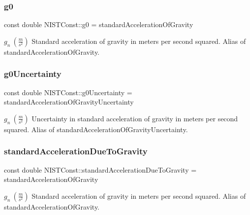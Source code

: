 \subsubsection{\texorpdfstring{g0}{g0}}
{\footnotesize\ttfamily const double N\+I\+S\+T\+Const\+::g0 = standard\+Acceleration\+Of\+Gravity}

$g_n \ (\frac{m}{s^2})$ Standard acceleration of gravity in meters per second squared. Alias of standard\+Acceleration\+Of\+Gravity. \mbox{\label{group___gravity_acceleration_ga2d6c266044ae894212cef601eb974a0f}} 
\subsubsection{\texorpdfstring{g0\+Uncertainty}{g0Uncertainty}}
{\footnotesize\ttfamily const double N\+I\+S\+T\+Const\+::g0\+Uncertainty = standard\+Acceleration\+Of\+Gravity\+Uncertainty}

$g_n \ (\frac{m}{s^2})$ Uncertainty in standard acceleration of gravity in meters per second squared. Alias of standard\+Acceleration\+Of\+Gravity\+Uncertainty. \mbox{\label{group___gravity_acceleration_ga7d417cb0027680e48ff481ab68a0864e}} 
\subsubsection{\texorpdfstring{standard\+Acceleration\+Due\+To\+Gravity}{standardAccelerationDueToGravity}}
{\footnotesize\ttfamily const double N\+I\+S\+T\+Const\+::standard\+Acceleration\+Due\+To\+Gravity = standard\+Acceleration\+Of\+Gravity}

$g_n \ (\frac{m}{s^2})$ Standard acceleration of gravity in meters per second squared. Alias of standard\+Acceleration\+Of\+Gravity. \mbox{\label{group___gravity_acceleration_ga80a7a9469b199febff956dcbda1b5e1b}} 
